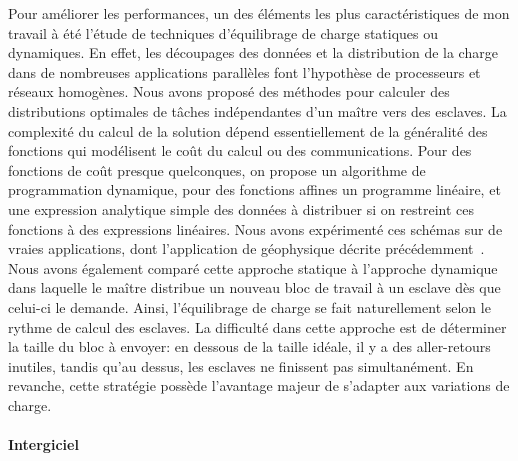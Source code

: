 \documentclass[11pt]{article}
\begin{document}
Pour améliorer les performances, un des éléments les plus caractéristiques de mon
travail à été l'étude de techniques d'équilibrage de charge statiques ou dynamiques. 
En effet, les découpages des données et la distribution
de la charge dans de nombreuses applications parallèles font l'hypothèse de processeurs
et réseaux homogènes. Nous avons proposé des méthodes pour calculer des distributions
optimales de tâches indépendantes d'un maître vers des esclaves. La complexité du calcul
de la solution dépend essentiellement de la généralité des fonctions qui modélisent le 
coût du calcul ou des communications. Pour des fonctions de coût presque quelconques, 
on propose un algorithme de programmation dynamique, pour des fonctions affines un
programme linéaire, et une expression analytique simple des données à distribuer si
on restreint ces fonctions à des expressions linéaires. Nous avons expérimenté ces 
schémas sur de vraies applications, dont l'application de géophysique décrite
précédemment~\cite{icps-2002-62,icps-2003-75,icps-2004-125}. Nous avons également
comparé cette approche statique à l'approche dynamique dans laquelle le maître distribue
un nouveau bloc de travail à un esclave dès que celui-ci le demande. Ainsi, l'équilibrage de
charge se fait naturellement selon le rythme de calcul des esclaves. La difficulté 
dans cette approche est de déterminer la taille du bloc à envoyer: en dessous de la 
taille idéale, il y a des aller-retours inutiles, tandis qu'au dessus, les esclaves
ne finissent pas simultanément. En revanche, cette stratégie possède l'avantage majeur
de s'adapter aux variations de charge.


\paragraph{Intergiciel}
\end{document}
